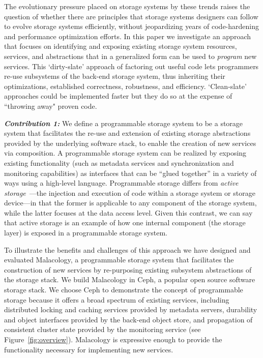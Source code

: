 The evolutionary pressure placed on storage systems by these trends raises the
question of whether there are principles that storage systems designers can
follow to evolve storage systems efficiently, without jeopardizing years of
code-hardening and performance optimization efforts.  In this paper we
investigate an approach that focuses on identifying and exposing existing
storage system resources, services, and abstractions that in a generalized form
can be used to \emph{program} new services. This `dirty-slate' approach of
factoring out useful code lets programmers re-use subsystems of the back-end
storage system, thus inheriting their optimizations, established correctness,
robustness, and efficiency. `Clean-slate' approaches could be implemented
faster but they do so at the expense of ``throwing away" proven code.

{\it \textbf{Contribution 1:}} We define a programmable storage system to be a
storage system that facilitates the re-use and extension of existing storage
abstractions provided by the underlying software stack, to enable the creation
of new services via composition.  A programmable storage system can be realized
by exposing existing functionality (such as  metadata services and synchronization and monitoring capabilities) as
interfaces that can be ``glued together'' in a variety of ways using a
high-level language. Programmable storage differs from \emph{active
storage}~\cite{riedel:vldb98}---the injection and execution of code within a
storage system or storage device---in that the former is applicable to any
component of the storage system, while the latter focuses at the data access
level. Given this contrast, we can say that active storage is an example of how
one internal component (the storage layer) is exposed in a programmable storage
system.  

To illustrate the benefits and challenges of this approach we have designed and
evaluated Malacology, a programmable storage system that facilitates the
construction of new services by re-purposing existing subsystem abstractions of
the storage stack.  We build Malacology in Ceph, a popular open source software
storage stack.  We choose Ceph to demonstrate the concept of programmable
storage because it offers a broad spectrum of existing services, including
distributed locking and caching services provided by  metadata servers, durability and object interfaces provided by the
back-end object store, and propagation of consistent cluster state provided by
the monitoring service (see Figure~\ref{fig:overview}).  Malacology is
expressive enough to provide the functionality necessary for implementing new
services.  

